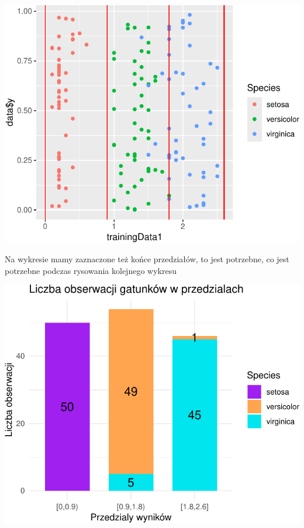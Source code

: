 \documentclass[
  12pt,
]{article}
\begin{document}
\begin{center}\includegraphics{Sprawozdanie2_files/figure-latex/givenRanges_najl-1} \end{center}

Na wykresie mamy zaznaczone też końce przedziałów, to jest potrzebne, co
jest potrzebne podczas rysowania kolejnego wykresu

\begin{center}\includegraphics{Sprawozdanie2_files/figure-latex/tabela_kondygnacji_4_najl-1} \end{center}
\end{document}
